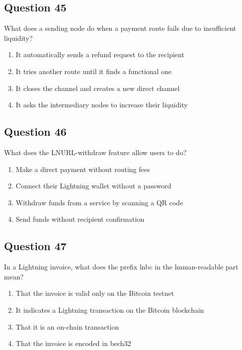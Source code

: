 \documentclass[12pt,a4paper]{article}
\begin{document}
\bigskip


\subsection*{Question 45}
What does a sending node do when a payment route fails due to insufficient liquidity?

\begin{enumerate}[label=\Alph*., leftmargin=*]
\item It automatically sends a refund request to the recipient
\item It tries another route until it finds a functional one
\item It closes the channel and creates a new direct channel
\item It asks the intermediary nodes to increase their liquidity
\end{enumerate}

\bigskip


\subsection*{Question 46}
What does the LNURL-withdraw feature allow users to do?

\begin{enumerate}[label=\Alph*., leftmargin=*]
\item Make a direct payment without routing fees
\item Connect their Lightning wallet without a password
\item Withdraw funds from a service by scanning a QR code
\item Send funds without recipient confirmation
\end{enumerate}

\bigskip


\subsection*{Question 47}
In a Lightning invoice, what does the prefix lnbc in the human-readable part mean?

\begin{enumerate}[label=\Alph*., leftmargin=*]
\item That the invoice is valid only on the Bitcoin testnet
\item It indicates a Lightning transaction on the Bitcoin blockchain
\item That it is an on-chain transaction
\item That the invoice is encoded in bech32
\end{enumerate}
\end{document}
